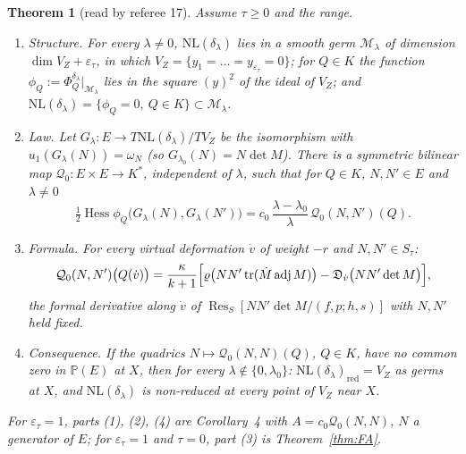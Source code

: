 \documentclass[11pt]{article}
\numberwithin{equation}{section}
\newtheorem{theorem}{Theorem}[section]
\theoremstyle{remark}
\newcommand{\PP}{\mathbb{P}}
\newcommand{\NL}{\mathrm{NL}}
\newcommand{\VZ}{V_Z}
\newcommand{\cM}{\mathcal{M}}
\newcommand{\Res}{\operatorname{Res}}
\newcommand{\Hess}{\operatorname{Hess}}
\newcommand{\lz}{\lambda_0}
\newcommand{\et}{\varepsilon_\tau}
\begin{document}
\begin{theorem}[read by referee 17]\label{thm:FA2}
Assume $\tau\ge0$ and the range.
\begin{enumerate}
\item \emph{Structure.} For every $\lambda\ne0$, $\NL(\delta_\lambda)$ lies in a smooth germ $\cM_\lambda$ of
dimension $\dim\VZ+\et$, in which $\VZ=\{y_1=\dots=y_{\et}=0\}$; for $Q\in K$ the function
$\phi_Q:=\Phi^{\delta_\lambda}_Q|_{\cM_\lambda}$ lies in the square $(y)^2$ of the ideal of $\VZ$; and
$\NL(\delta_\lambda)=\{\phi_Q=0,\ Q\in K\}\subset\cM_\lambda$.
\item \emph{Law.} Let $G_\lambda\colon E\to T\NL(\delta_\lambda)/T\VZ$ be the isomorphism with
$u_1(G_\lambda(N))=\omega_N$ (so $G_{\lz}(N)=N\det M$). There is a symmetric bilinear map
$\mathcal Q_0\colon E\times E\to K^*$, independent of $\lambda$, such that for $Q\in K$, $N,N'\in E$ and
$\lambda\ne0$
\[
\tfrac12\Hess\phi_Q\bigl(G_\lambda(N),G_\lambda(N')\bigr)=c_0\,\frac{\lambda-\lz}{\lambda}\,\mathcal Q_0(N,N')(Q).
\]
\item \emph{Formula.} For every virtual deformation $\dot v$
of weight $-r$ and $N,N'\in S_\tau$:
\[
\mathcal Q_0(N,N')\bigl(Q(\dot v)\bigr)=\frac{\kappa}{k+1}\Bigl[\varrho\bigl(NN'\operatorname{tr}(\dot M\operatorname{adj}M)\bigr)
-\mathfrak D_{\dot v}\bigl(NN'\det M\bigr)\Bigr],
\]
the formal derivative along $\dot v$ of $\Res_S[NN'\det M/(f,p;h,s)]$ with $N,N'$ held fixed.
\item \emph{Consequence.} If the quadrics $N\mapsto\mathcal Q_0(N,N)(Q)$, $Q\in K$, have no common zero in
$\PP(E)$ at $X$, then for every $\lambda\notin\{0,\lz\}$: $\NL(\delta_\lambda)_{\mathrm{red}}=\VZ$ as germs at $X$, and
$\NL(\delta_\lambda)$ is non-reduced at every point of $\VZ$ near $X$.
\end{enumerate}
For $\et=1$, parts (1), (2), (4) are Corollary~4 with $A=c_0\mathcal Q_0(N,N)$, $N$ a generator of $E$; for
$\et=1$ and $\tau=0$, part (3) is Theorem~\ref{thm:FA}.
\end{theorem}
\end{document}

